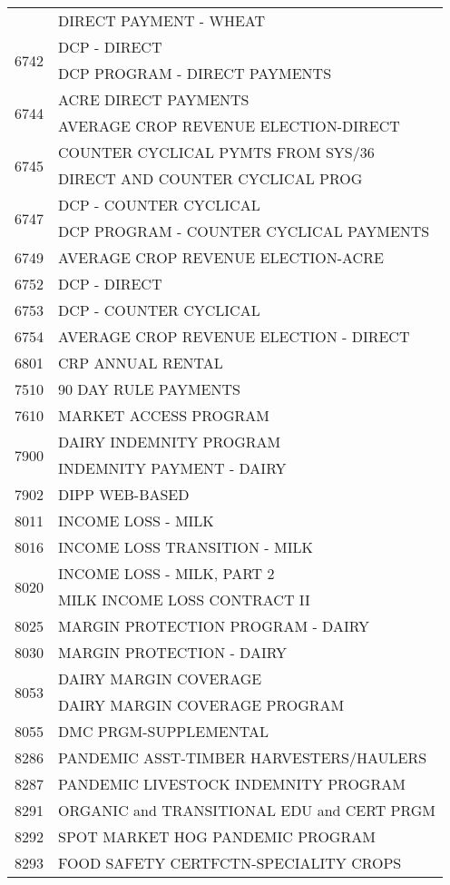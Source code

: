 \begin{longtable}{ll}
 & DIRECT PAYMENT - WHEAT \\
\cline{1-2}
\multirow[t]{2}{*}{6742} & DCP - DIRECT \\
 & DCP PROGRAM - DIRECT PAYMENTS \\
\cline{1-2}
\multirow[t]{2}{*}{6744} & ACRE DIRECT PAYMENTS \\
 & AVERAGE CROP REVENUE ELECTION-DIRECT \\
\cline{1-2}
\multirow[t]{2}{*}{6745} & COUNTER CYCLICAL PYMTS FROM SYS/36 \\
 & DIRECT AND COUNTER CYCLICAL PROG \\
\cline{1-2}
\multirow[t]{2}{*}{6747} & DCP - COUNTER CYCLICAL \\
 & DCP PROGRAM - COUNTER CYCLICAL PAYMENTS \\
\cline{1-2}
6749 & AVERAGE CROP REVENUE ELECTION-ACRE \\
\cline{1-2}
6752 & DCP - DIRECT \\
\cline{1-2}
6753 & DCP - COUNTER CYCLICAL \\
\cline{1-2}
6754 & AVERAGE CROP REVENUE ELECTION - DIRECT \\
\cline{1-2}
6801 & CRP ANNUAL RENTAL \\
\cline{1-2}
7510 & 90 DAY RULE PAYMENTS \\
\cline{1-2}
7610 & MARKET ACCESS PROGRAM \\
\cline{1-2}
\multirow[t]{2}{*}{7900} & DAIRY INDEMNITY PROGRAM \\
 & INDEMNITY PAYMENT - DAIRY \\
\cline{1-2}
7902 & DIPP WEB-BASED \\
\cline{1-2}
8011 & INCOME LOSS - MILK \\
\cline{1-2}
8016 & INCOME LOSS TRANSITION - MILK \\
\cline{1-2}
\multirow[t]{2}{*}{8020} & INCOME LOSS - MILK, PART 2 \\
 & MILK INCOME LOSS CONTRACT II \\
\cline{1-2}
8025 & MARGIN PROTECTION PROGRAM - DAIRY \\
\cline{1-2}
8030 & MARGIN PROTECTION  - DAIRY \\
\cline{1-2}
\multirow[t]{2}{*}{8053} & DAIRY MARGIN COVERAGE \\
 & DAIRY MARGIN COVERAGE PROGRAM \\
\cline{1-2}
8055 & DMC PRGM-SUPPLEMENTAL \\
\cline{1-2}
8286 & PANDEMIC ASST-TIMBER HARVESTERS/HAULERS \\
\cline{1-2}
8287 & PANDEMIC LIVESTOCK INDEMNITY PROGRAM \\
\cline{1-2}
8291 & ORGANIC and TRANSITIONAL EDU and CERT PRGM \\
\cline{1-2}
8292 & SPOT MARKET HOG PANDEMIC PROGRAM \\
\cline{1-2}
8293 & FOOD SAFETY CERTFCTN-SPECIALITY CROPS \\
\cline{1-2}
\end{longtable}
